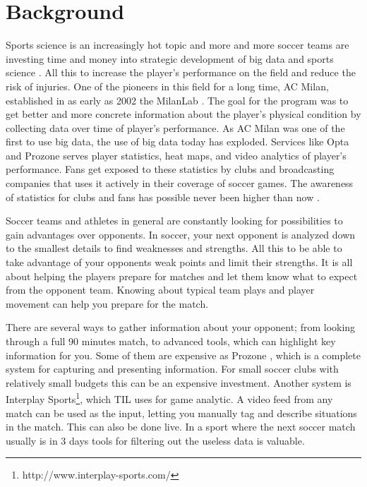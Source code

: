 \section{Background}

Sports science is an increasingly hot topic and more and more soccer teams are investing time and money into strategic development of big data and sports science \cite{bigdata:majorleague}. All this to increase the player’s performance on the field and reduce the risk of injuries. One of the pioneers in this field for a long time, AC Milan, established in as early as 2002 the MilanLab \cite{bigdata:milanlab}. The goal for the program was to get better and more concrete information about the player’s physical condition by collecting data over time of player’s performance. As AC Milan was one of the first to use big data, the use of big data today has exploded. Services like Opta and Prozone serves player statistics, heat maps, and video analytics of player’s performance. Fans get exposed to these statistics by clubs and broadcasting companies that uses it actively in their coverage of soccer games. The awareness of statistics for clubs and fans has possible never been higher than now \cite{dailymailOnStatistics}.

Soccer teams and athletes in general are constantly looking for possibilities to gain advantages over opponents. In soccer, your next opponent is analyzed down to the smallest details to find weaknesses and strengths. All this to be able to take advantage of your opponents weak points and limit their strengths. It is all about helping the players prepare for matches and let them know what to expect from the opponent team. Knowing about typical team plays and player movement can help you prepare for the match. 

There are several ways to gather information about your opponent; from looking through a full 90 minutes match, to advanced tools, which can highlight key information for you. Some of them are expensive as Prozone \cite{Prozone:indepth}, which is a complete system for capturing and presenting information. For small soccer clubs with relatively small budgets this can be an expensive investment. Another system is Interplay Sports\footnote{http://www.interplay-sports.com/}, which \ac{TIL} uses for game analytic. A video feed from any match can be used as the input, letting you manually tag and describe situations in the match. This can also be done live. In a sport where the next soccer match usually is in 3 days tools for filtering out the useless data is valuable.

